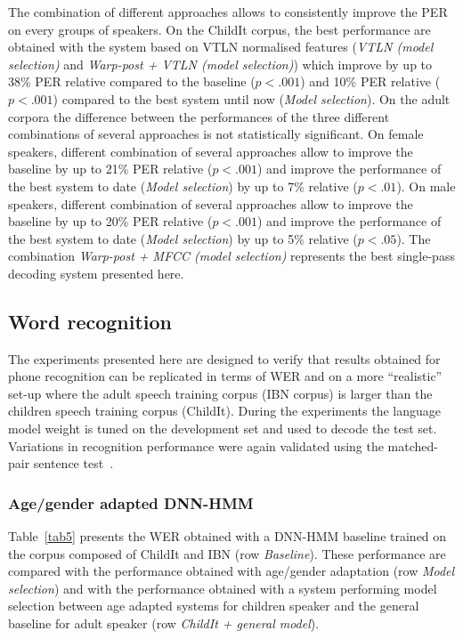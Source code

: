 \documentclass{nle}
\begin{document}
The combination of different approaches allows to consistently improve the PER on every groups of speakers. On the ChildIt corpus, the best performance are obtained with the system based on VTLN normalised features ({\em VTLN (model selection)} and {\em Warp-post + VTLN (model selection)}) which improve by up to 38\% PER relative compared to the baseline ($p  <.001$) and 10\% PER relative ($p  <.001$) compared to the best system until now ({\em Model selection}). On the adult corpora the difference between the performances of the three different combinations of several approaches is not statistically significant. On female speakers, different combination of several approaches allow to improve the baseline by up to 21\% PER relative ($p  <.001$) and improve the performance of the best system to date ({\em Model selection}) by up to 7\% relative ($p  <.01$). On male speakers, different combination of several approaches allow to improve the baseline by up to 20\% PER relative ($p  <.001$) and improve the performance of the best system to date ({\em Model selection}) by up to 5\% relative ($p  <.05$). The combination {\em Warp-post + MFCC (model selection)} represents the best single-pass decoding system presented here.


\subsection{Word recognition}
The experiments presented here are designed to verify that results obtained for phone recognition can be replicated  in terms of WER and on a more ``realistic'' set-up where the adult speech training corpus (IBN corpus) is larger than the children speech training corpus (ChildIt). During the experiments the language model weight is tuned on the development set and used to decode the test set. Variations  in recognition performance were again validated using the matched-pair  sentence test~\citep{GilCox89}. 
\subsubsection{Age/gender adapted DNN-HMM}
Table~\ref{tab5} presents the WER obtained with a DNN-HMM  baseline trained on the corpus composed of ChildIt and IBN (row  {\em  Baseline}). These performance are compared with the performance obtained with age/gender adaptation (row {\em Model selection}) and with the performance obtained with a system performing model selection between age adapted systems for children speaker and the general baseline for adult speaker (row {\em ChildIt + general model}).
\end{document}
